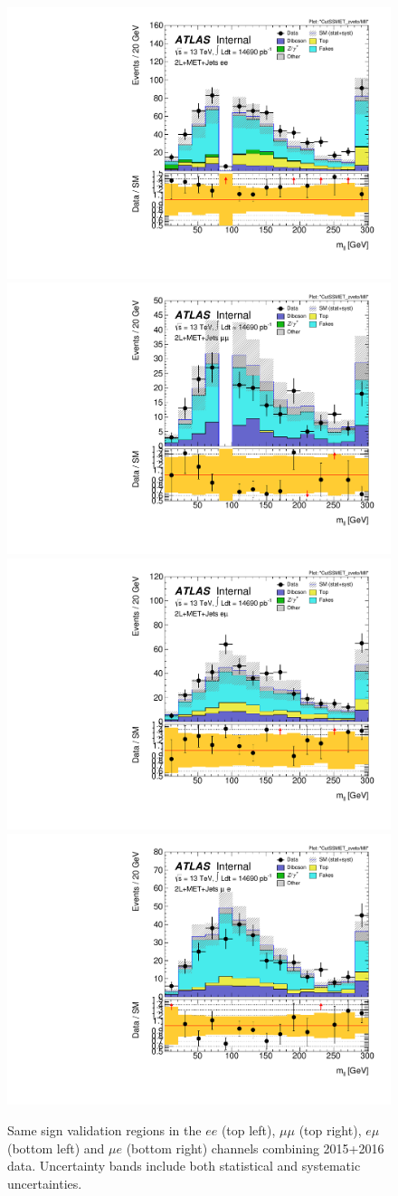 \begin{centering}
\begin{figure}[!htb]
\centering
\includegraphics[width=.45\textwidth]{figures/fakes/ee-CutSSMET_zveto-Mll-lin.pdf}
\includegraphics[width=.45\textwidth]{figures/fakes/mm-CutSSMET_zveto-Mll-lin.pdf}
\includegraphics[width=.45\textwidth]{figures/fakes/em-CutSSMET_zveto-Mll-lin.pdf}
\includegraphics[width=.45\textwidth]{figures/fakes/me-CutSSMET_zveto-Mll-lin.pdf}
\caption{Same sign validation regions in the $ee$ (top left), $\mu\mu$ (top right), $e\mu$ (bottom left) and $\mu e$ (bottom right) channels combining 2015+2016 data. Uncertainty bands include both statistical and systematic uncertainties. \label{fig:fakes_validation}}
\end{figure}
\end{centering}

